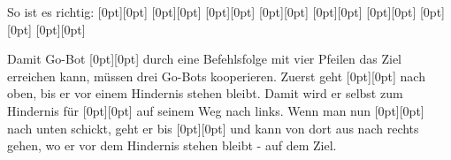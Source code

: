 \documentclass[a4paper,11pt]{report}
\newcommand{\taskGraphicsFolder}{..}
\begin{document}
So ist es richtig:
\raisebox{-0.5ex}[0pt][0pt]{} \raisebox{-0.5ex}[0pt][0pt]{}  \raisebox{-0.5ex}[0pt][0pt]{} \raisebox{-0.5ex}[0pt][0pt]{}  \raisebox{-0.5ex}[0pt][0pt]{} \raisebox{-0.5ex}[0pt][0pt]{}  \raisebox{-0.5ex}[0pt][0pt]{} \raisebox{-0.5ex}[0pt][0pt]{}

Damit Go-Bot \raisebox{-0.5ex}[0pt][0pt]{} durch eine Befehlsfolge mit vier Pfeilen das Ziel erreichen kann, müssen drei Go-Bots kooperieren.
Zuerst geht \raisebox{-0.5ex}[0pt][0pt]{} nach oben, bis er vor einem Hindernis stehen bleibt.
Damit wird er selbst zum Hindernis für \raisebox{-0.5ex}[0pt][0pt]{} auf seinem Weg nach links.
Wenn man nun \raisebox{-0.5ex}[0pt][0pt]{} nach unten schickt, geht er bis \raisebox{-0.5ex}[0pt][0pt]{} und kann von dort aus nach rechts gehen,
wo er vor dem Hindernis stehen bleibt - auf dem Ziel.

{\centering%
\par}
\end{document}
